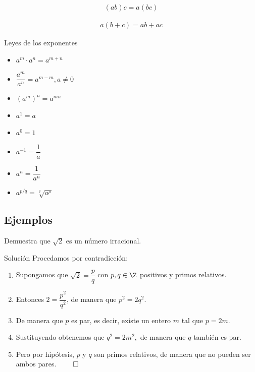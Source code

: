 
{}
	\begin{axioma}
		\label{axiom--4}
		\begin{align*}
		(ab)c = a(bc)
		\end{align*}
	\end{axioma}

{}
	\begin{axioma}
		\label{axiom--5}
		\begin{align*}
		a(b+c)=ab+ac
		\end{align*}
	\end{axioma}

{Leyes de los exponentes}
	\begin{itemize}
		\item $a^{m}\cdot a^{n} = a^{m+n}$ 
		\item $\dfrac{a^{m}}{a^{n}} = a^{m-m}, a\neq 0$ 
		\item $\left(a^{m}\right)^{n} = a^{mn}$
	\end{itemize}


	\begin{itemize}
		\item $ a^{1}= a $ 
		\item $ a^{0}= 1 $ 
		\item $ a^{-1}= \dfrac{1}{a} $ 
		\item $ a^{n}= \dfrac{1}{a^{n}}  $
		\item $ a^{p/q}= \sqrt[q]{a^{p}} $
	\end{itemize}

\subsection{Ejemplos}

{}
 \begin{problema}
 	Demuestra que $\sqrt{2}$ es un número irracional.
 \end{problema}

{Solución}
	Procedamos por contradicción: 
	\begin{enumerate}
		\item Supongamos que $\sqrt{2}=\dfrac{p}{q}$ con $ p,q \in \Z$ positivos y primos relativos.  
		\item Entonces $ 2= \dfrac{p^{2}}{q^{2}}$, de manera que $p^{2}=2q^{2}$.
		\item De manera que $p$ es par, es decir, existe un entero $m$ tal que $p=2m$. 
		\item Sustituyendo obtenemos que $q^{2}=2m^{2},$ de manera que $q$ también es par. 
		\item Pero por hipótesis, $p$ y $q$ son primos relativos, de manera que no pueden ser ambos pares. $\qed$
	\end{enumerate}


